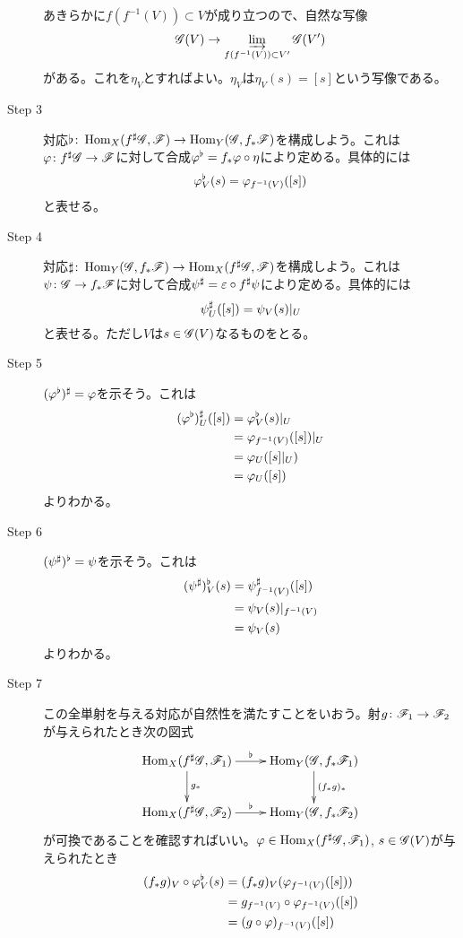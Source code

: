 \begin{description}
  あきらかに$f(f^{-1}(V)) \subset V$が成り立つので、自然な写像
  \[
  \mathscr{G}(V) \to \operatorname*{\varinjlim}_{f(f^{-1}(V)) \subset V' } \mathscr{G}(V')
  \]
  がある。これを$\eta_V$とすればよい。$\eta_V$は$\eta_V(s) = [s] $という写像である。
  \item[Step 3] 対応$\flat \colon \operatorname{Hom}_X(f^{\sharp}\mathscr{G} , \mathscr{F}) \to \operatorname{Hom}_Y(\mathscr{G} , f_*\mathscr{F})$を構成しよう。これは${\varphi} \colon f^{\sharp}\mathscr{G} \to \mathscr{F}$に対して合成${\varphi}^{\flat} = f_* {\varphi} \circ \eta$により定める。具体的には
  \[
  {\varphi}^{\flat}_V (s) = {\varphi}_{f^{-1}(V)} ([s])
  \]
  と表せる。
  \item[Step 4] 対応$\sharp \colon \operatorname{Hom}_Y(\mathscr{G} , f_*\mathscr{F}) \to \operatorname{Hom}_X(f^{\sharp}\mathscr{G} , \mathscr{F})$を構成しよう。これは$\psi \colon \mathscr{G} \to f_* \mathscr{F}$に対して合成$\psi^{\sharp} = {\varepsilon} \circ f^{\sharp} \psi$により定める。具体的には
  \[
  \psi^{\sharp}_U([s]) = \psi_V(s) |_U
  \]
  と表せる。ただし$V$は$s \in \mathscr{G}(V)$なるものをとる。
  \item[Step 5] $({\varphi}^{\flat})^{\sharp} = {\varphi}$を示そう。これは
  \begin{align*}
    ({\varphi}^{\flat})^{\sharp}_U([s]) &= {\varphi}^{\flat}_V (s) |_U \\
    &= {\varphi}_{f^{-1}(V)} ([s]) |_U \\
    &= {\varphi}_U ( [s] |_U  ) \\
    &= {\varphi}_U([s])
  \end{align*}
  よりわかる。
  \item[Step 6] $(\psi^{\sharp})^{\flat} = \psi$を示そう。これは
  \begin{align*}
    (\psi^{\sharp})^{\flat}_V(s) &= \psi^{\sharp}_{f^{-1}(V)}([s]) \\
    &= \psi_V(s)|_{f^{-1}(V)} \\
    &= \psi_V(s)
  \end{align*}
  よりわかる。
  \item[Step 7] この全単射を与える対応が自然性を満たすことをいおう。射$g \colon \mathscr{F}_1 \to \mathscr{F}_2$が与えられたとき次の図式
  \[
  \xymatrix{
  \Hom_X(f\sh\scrg, \scrf_1) \ar[r]^-{\flat} \ar[d]^-{g_*} & \Hom_Y(\scrg,f_*\scrf_1) \ar[d]^-{(f_*g)_*} \\
  \Hom_X(f\sh\scrg, \scrf_2) \ar[r]^-{\flat} & \Hom_Y(\scrg,f_*\scrf_2)
  }
  \]
  が可換であることを確認すればいい。${\varphi} \in \operatorname{Hom}_X(f^{\sharp}\mathscr{G}, \mathscr{F}_1)$, $s \in \mathscr{G}(V)$が与えられたとき
  \begin{align*}
    (f_* g)_V \circ \vp\fl_V(s) &= (f_*g)_V ( \vp_{f^{-1}(V)}([s]) ) \\
    &= g_{f^{-1}(V)} \circ \vp_{f^{-1}(V)} ([s]) \\
    &= (g \circ \vp)_{ f^{-1}(V)} ([s]) \\

\end{align*}
\end{description}
